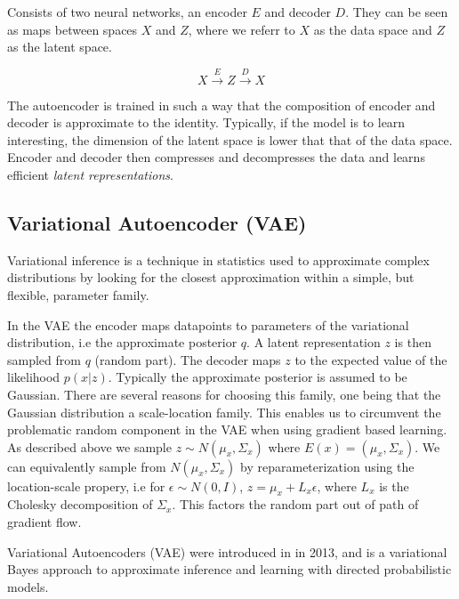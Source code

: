\documentclass[../../thesis.tex]{subfiles}
\begin{document}
Consists of two neural networks, an encoder $E$ and decoder $D$. They can be seen as maps between spaces $X$ and $Z$, where we referr to $X$ as the data space and $Z$ as the latent space. 

\begin{equation}
    X \xrightarrow{E} Z \xrightarrow{D} X 
\end{equation}

The autoencoder is trained in such a way that the composition of encoder and decoder is approximate to the identity. Typically, if the model is to learn interesting, the dimension of the latent space is lower that that of the data space. Encoder and decoder then compresses and decompresses the data and learns efficient \textit{latent representations}. 

\subsection{Variational Autoencoder (VAE)}
Variational inference is a technique in statistics used to approximate complex distributions by looking for the closest approximation within a simple, but flexible, parameter family. \newline 

In the VAE the encoder maps datapoints to parameters of the variational distribution, i.e the approximate posterior $q$. A latent representation $z$ is then sampled from $q$ (random part). The decoder maps $z$ to the expected value of the likelihood $p(x|z)$. Typically the approximate posterior is assumed to be Gaussian. There are several reasons for choosing this family, one being that the Gaussian distribution a scale-location family. This enables us to circumvent the problematic random component in the VAE when using gradient based learning. As described above we sample $z\sim N(\mu_x,\Sigma_x)$ where $E(x) = (\mu_x,\Sigma_x)$. We can equivalently sample from $N(\mu_x,\Sigma_x)$ by reparameterization using the location-scale propery, i.e for $\epsilon \sim N(0,I)$, $z = \mu_x + L_x\epsilon $, where $L_x$ is the Cholesky decomposition of $\Sigma_x$. This factors the random part out of path of gradient flow.\newline

Variational Autoencoders (VAE) were introduced in \cite{kingma2022autoencoding} in 2013, and is a variational Bayes approach to approximate inference and learning with directed probabilistic models.\newline
\end{document}
